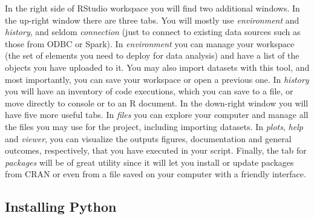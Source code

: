 In the right side of RStudio workspace you will find two additional
windows. In the up-right window there are three tabs. You will mostly
use \emph{environment} and \emph{history}, and seldom
\emph{connection} (just to connect to existing data sources such as
those from ODBC or Spark). In \emph{environment} you can manage your
workspace (the set of elements you need to deploy for data analysis)
and have a list of the objects you have uploaded to it. You may also
import datasets with this tool, and most importantly, you can save
your workspace or open a previous one. In \emph{history} you will
have an inventory of code executions, which you can save to a file, or
move directly to console or to an R document. In the down-right window
you will have five more useful tabs. In \emph{files} you can explore
your computer and manage all the files you may use for the project,
including importing datasets. In \emph{plots}, \emph{help} and
\emph{viewer}, you can visualize the outputs figures, documentation
and general outcomes, respectively, that you have executed in your
script. Finally, the tab for \emph{packages} will be of great
utility since it will let you install or update packages from CRAN or
even from a file saved on your computer with a friendly interface.


\subsection{Installing Python}

